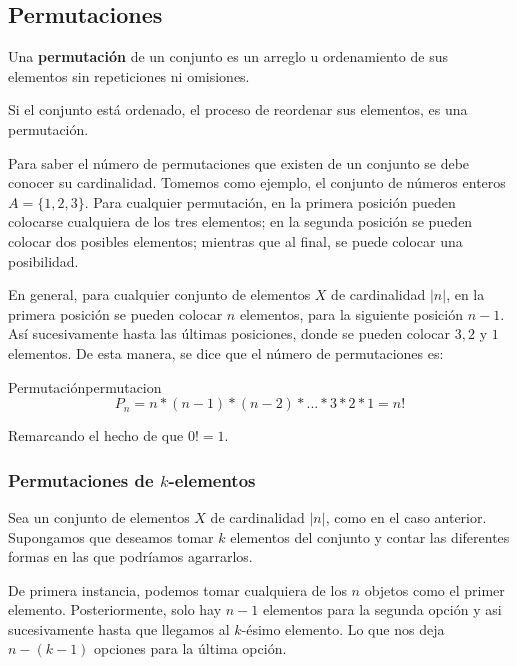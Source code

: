 
\subsection{Permutaciones}

\begin{tcolorbox}[colback=gray!5!white,colframe=gray!60!black,title=Definición: Permutación]
	Una \textbf{permutaci\'on} de un conjunto es un arreglo u ordenamiento de sus
	elementos sin repeticiones ni omisiones.
	
	Si el conjunto está ordenado, el proceso de reordenar sus elementos, es una permutación.
	\label{Permutaciones_definition}
\end{tcolorbox}

Para saber el n\'umero de permutaciones que existen de un conjunto se debe
conocer su cardinalidad. Tomemos como ejemplo, el conjunto de n\'umeros enteros
$A=\{1, 2, 3\}$. Para cualquier permutaci\'on, en la primera posici\'on pueden
colocarse cualquiera de los tres elementos; en la segunda posición se pueden
colocar dos posibles elementos; mientras que al final, se puede colocar una
posibilidad.

En general, para cualquier conjunto de elementos $X$ de cardinalidad $|n|$, en
la primera posici\'on se pueden colocar $n$ elementos, para la siguiente
posici\'on $n-1$. Así sucesivamente hasta las \'ultimas posiciones, donde se
pueden colocar $3, 2$ y $1$ elementos. De esta manera, se dice que el n\'umero
de permutaciones es:

\begin{theorem}{Permutación}{permutacion}
	\begin{equation}
		P_n=n*(n-1)*(n-2)*...*3*2*1=n!
		\label{permutaciones_totales}
	\end{equation}
	
	Remarcando el hecho de que $0! = 1$.

\end{theorem}

\subsubsection{Permutaciones de $k$-elementos}

Sea un conjunto de elementos $X$ de cardinalidad $|n|$, como en el caso
anterior. Supongamos que deseamos tomar $k$ elementos del conjunto y contar las
diferentes formas en las que podríamos agarrarlos.

De primera instancia, podemos tomar cualquiera de los $n$ objetos como el primer
elemento. Posteriormente, solo hay $n-1$ elementos para la segunda opción y asi
sucesivamente hasta que llegamos al $k$-ésimo elemento. Lo que nos deja
$n-(k-1)$ opciones para la última opción.

